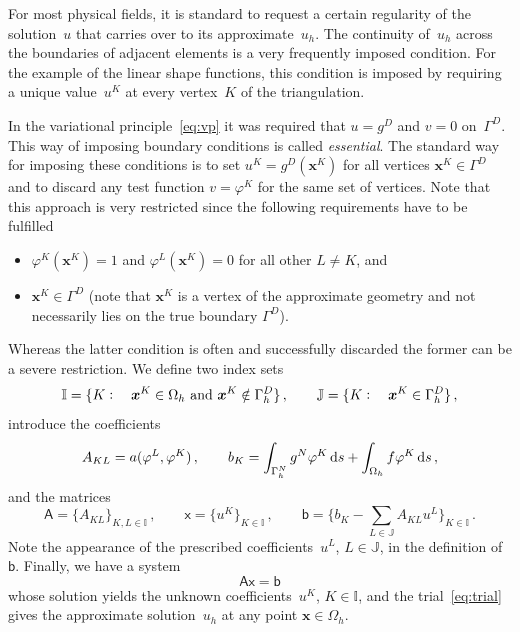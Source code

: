 \documentclass[a4paper,DIV=12,10pt]{scrartcl}
\newcommand{\vek}[1]{\boldsymbol{#1}}  %
\newcommand{\mat}[1]{\mathsf{#1}}      %
\newcommand{\col}[0]{\vcentcolon}
\newcommand{\x}[0]{\vek{x}}
\begin{document}
For most physical fields, it is standard to request a certain
regularity of the solution~$u$ that carries over to its
approximate~$u_h$. The continuity of~$u_h$ across the boundaries of
adjacent elements is a very frequently imposed condition. For the
example of the linear shape functions, this condition is imposed by
requiring a unique value~$u^K$ at every vertex~$K$ of the triangulation.

In the variational principle~\eqref{eq:vp} it was required that $u =
g^D$ and $v =0$ on~$\Gamma^D$. This way of imposing boundary
conditions is called \emph{essential}. The standard way for imposing
these conditions is to set $u^K = g^D(\x^K)$ for all vertices $\x^K \in
\Gamma^D$ and to discard any test function $v = \varphi^K$ for the same
set of vertices. Note that this approach is very restricted since the
following requirements have to be fulfilled
\begin{itemize}
\item $\varphi^K(\x^K) = 1$ and $\varphi^L(\x^K) = 0$ for all other $L \neq
  K$, and
\item $\x^K \in \Gamma^D$ (note that $\x^K$ is a vertex of the
  approximate geometry and not necessarily lies on the true boundary
  $\Gamma^D$).
\end{itemize}
Whereas the latter condition is often and successfully discarded the
former can be a severe restriction. We define two index sets
\begin{equation}
  \label{eq:indexSets}
    \mathbb{I} = \{ K\col \quad \x^K \in \Omega_h \text{ and }
    \x^K \notin \Gamma_h^D \} \,,\qquad
    \mathbb{J} = \{ K\col \quad \x^K \in \Gamma_h^D \}\,,
\end{equation}
introduce the coefficients
\begin{equation}
  \label{eq:syscoeff}
  A_{KL} = a( \varphi^L, \varphi^K ) \,, \qquad
  b_K    = \int_{\Gamma_h^N} g^N \varphi^K \dif s + \int_{\Omega_h} f
  \varphi^K \dif s\,,
\end{equation}
and the matrices
\begin{equation}
  \label{eq:matrices}
  \mat{A} = \{ A_{KL} \}_{K,L \in \mathbb{I}}\,, \qquad
  \mat{x} = \{ u^K \}_{K \in \mathbb{I}} \,, \qquad
  \mat{b} = \{b_K - \sum_{L \in \mathbb{J}}
  A_{KL} u^L \}_{K \in \mathbb{I}}\,.
\end{equation}
Note the appearance of the prescribed coefficients~$u^L$, $L \in
\mathbb{J}$, in the definition of~$\mat{b}$. Finally, we have a system 
\begin{equation}
  \label{eq:system}
  \mat{A} \mat{x} = \mat{b}
\end{equation}
whose solution yields the unknown coefficients~$u^K$, $K \in
\mathbb{I}$, and the trial~\eqref{eq:trial} gives the approximate
solution~$u_h$ at any point $\x \in \Omega_h$.
\end{document}
